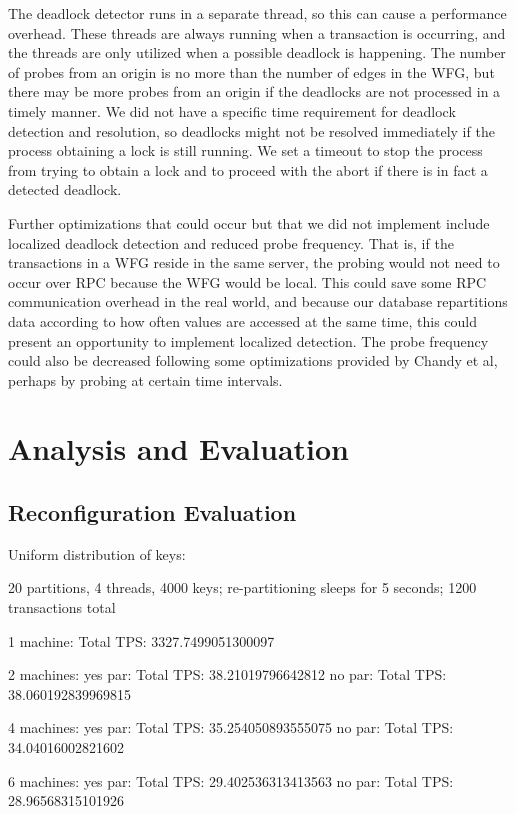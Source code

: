 \documentclass[a4paper, 10pt, notitlepage]{report}
\begin{document}
The deadlock detector runs in a separate thread, so this can cause a performance overhead. These threads are always running when a transaction is occurring, and the threads are only utilized when a possible deadlock is happening. The number of probes from an origin is no more than the number of edges in the WFG, but there may be more probes from an origin if the deadlocks are not processed in a timely manner. We did not have a specific time requirement for deadlock detection and resolution, so deadlocks might not be resolved immediately if the process obtaining a lock is still running. We set a timeout to stop the process from trying to obtain a lock and to proceed with the abort if there is in fact a detected deadlock.

Further optimizations that could occur but that we did not implement include localized deadlock detection and reduced probe frequency. That is, if the transactions in a WFG reside in the same server, the probing would not need to occur over RPC because the WFG would be local. This could save some RPC communication overhead in the real world, and because our database repartitions data according to how often values are accessed at the same time, this could present an opportunity to implement localized detection. The probe frequency could also be decreased following some optimizations provided by Chandy et al, perhaps by probing at certain time intervals.

\section*{Analysis and Evaluation}

\subsection*{Reconfiguration Evaluation}

Uniform distribution of keys:

20 partitions, 4 threads, 4000 keys; re-partitioning sleeps for 5 seconds; 1200 transactions total

1 machine:
Total TPS: 3327.7499051300097

2 machines:
yes par: Total TPS: 38.21019796642812
no par: Total TPS: 38.060192839969815

4 machines:
yes par: Total TPS: 35.254050893555075
no par: Total TPS: 34.04016002821602

6 machines:
yes par: Total TPS: 29.402536313413563
no par: Total TPS: 28.96568315101926
\end{document}
